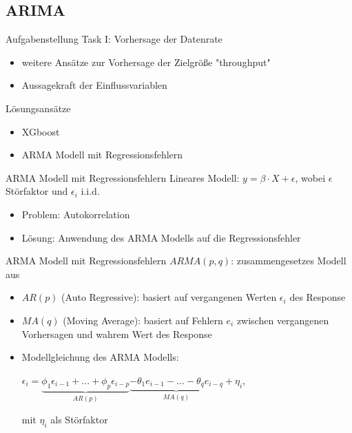 \subsection{ARIMA}


\begin{frame}{Aufgabenstellung Task I: Vorhersage der Datenrate}
\begin{itemize}
\item weitere Ansätze zur Vorhersage der Zielgröße "throughput"
\item Aussagekraft der Einflussvariablen
\end{itemize}
\end{frame}

\begin{frame}{Lösungsansätze}
\begin{itemize}
\item XGboost
\item ARMA Modell mit Regressionsfehlern
\end{itemize}
\end{frame}

\begin{frame}{ARMA Modell mit Regressionsfehlern}
Lineares Modell: $y = \beta \cdot X + \epsilon$, wobei $\epsilon$ Störfaktor und $\epsilon_{i}$ i.i.d.
\begin{itemize}
\item Problem: Autokorrelation
\item Lösung: Anwendung des ARMA Modells auf die Regressionsfehler
\end{itemize}
\end{frame}

\begin{frame}{ARMA Modell mit Regressionsfehlern}
$ARMA(p,q)$: zusammengesetzes Modell aus
\begin{itemize}
\item $AR(p)$ (Auto Regressive): basiert auf vergangenen Werten $\epsilon_{i}$ des Response 
\item $MA(q)$ (Moving Average): basiert auf Fehlern $e_{i}$ zwischen vergangenen Vorhersagen und wahrem Wert des Response
\item Modellgleichung des ARMA Modells: 
\begin{center}
$\epsilon_{i} = \underbrace{\phi_{1}\epsilon_{i-1}+ ... + \phi_{p}\epsilon_{i-p}}_{AR(p)} \underbrace{- \theta_{1}e_{i-1} - ... - \theta_{q}e_{i-q}}_{MA(q)} + \eta_{i}$,
\end{center}
mit $\eta_{i}$ als Störfaktor
\end{itemize}
\end{frame}

